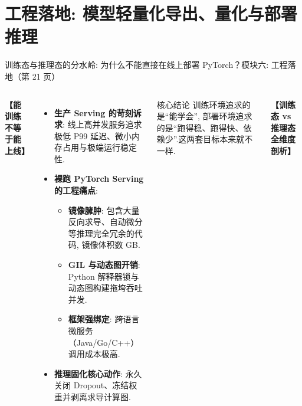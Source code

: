 \documentclass[aspectratio=169,9pt]{beamer}
\begin{document}
\section{工程落地: 模型轻量化导出、量化与部署推理}

\begin{frame}[fragile]{训练态与推理态的分水岭: 为什么不能直接在线上部署 PyTorch？}{模块六: 工程落地（第 21 页）}
\begin{columns}[T]
    \textbf{【能训练不等于能上线】}
    \begin{itemize}
        \item \textbf{生产 Serving 的苛刻诉求}: 线上高并发服务追求极低 P99 延迟、微小内存占用与极端运行稳定性.
        \item \textbf{裸跑 PyTorch Serving 的工程痛点}: 
            \begin{itemize}
                \item \textbf{镜像臃肿}: 包含大量反向求导、自动微分等推理完全冗余的代码, 镜像体积数 GB.
                \item \textbf{GIL 与动态图开销}: Python 解释器锁与动态图构建拖垮吞吐并发.
                \item \textbf{框架强绑定}: 跨语言微服务（Java/Go/C++）调用成本极高.
            \end{itemize}
        \item \textbf{推理固化核心动作}: 永久关闭 Dropout、冻结权重并剥离求导计算图.
    \end{itemize}

    \begin{alertblock}{核心结论}
        \scriptsize 训练环境追求的是“能学会”, 部署环境追求的是“跑得稳、跑得快、依赖少”.这两套目标本来就不一样.
    \end{alertblock}

    \textbf{【训练态 vs 推理态全维度剖析】}
    \vspace{1.5mm}


\end{columns}
\end{frame}
\end{document}
